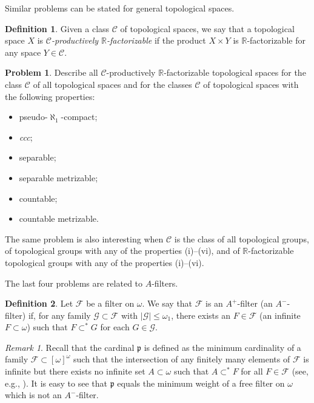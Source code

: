 \documentclass[a4paper,12pt]{amsart}
\theoremstyle{definition}
\newtheorem{definition}{Definition}[section]
\newtheorem{problem}{Problem}[section]
\theoremstyle{remark}
\newtheorem{remark}{Remark}[section]
\begin{document}
Similar problems can be stated for general topological spaces. 

\begin{definition}
Given a class $\mathscr C$ of topological spaces, we say that a topological space $X$ is 
\emph{$\mathscr C$-productively $\mathbb R$-factorizable} if the product $X\times Y$ is $\mathbb R$-factorizable 
for any space $Y\in \mathscr C$. 
\end{definition}

\begin{problem}
Describe all $\mathscr C$-productively $\mathbb R$-factorizable topological spaces for the 
class $\mathscr C$ of all topological spaces and for the classes $\mathscr C$ of topological spaces with the 
following properties: 
\begin{itemize}
\item[(i)]
pseudo-$\aleph_1$-compact;
\item[(ii)]
 \emph{ccc}; 
\item[(iii)]
separable; 
\item[(iv)]
separable metrizable; 
\item[(v)]
countable; 
\item[(vi)]
countable metrizable. 
\end{itemize}
The same problem is also interesting when $\mathscr C$ is the class of all topological groups, of topological 
groups with any of the properties \textup{(i)--(vi)}, and of $\mathbb R$-factorizable topological groups with any 
of the properties \textup{(i)--(vi)}. 
\end{problem}

The last four problems are related to $A$-filters.

\begin{definition}
Let $\mathscr F$ be a filter on $\omega$. We say that $\mathscr F$ is an $A^+$-filter (an $A^-$-filter) if, for 
any family $\mathscr G\subset \mathscr F$ with $|\mathscr G|\le\omega_1$, there exists an $F\in \mathscr F$ (an 
infinite $F\subset \omega$) such that $F\subset^* G$ for each $G\in \mathscr G$. 
\end{definition}

\begin{remark}
\label{Remark_6.1}
Recall that the cardinal $\mathfrak p$ is defined as the minimum cardinality of a family $\mathscr F\subset 
[\omega]^\omega$ such that the intersection of any finitely many elements of $\mathscr F$ is infinite but there 
exists no infinite set $A\subset \omega$ such that $A\subset^*F$ for all $F\in \mathscr F$ (see, e.g., 
\cite{vD}). It is easy to see that $\mathfrak p$ equals the minimum weight of a free filter on $\omega$ 
which is not an $A^-$-filter.
\end{remark}
\end{document}
